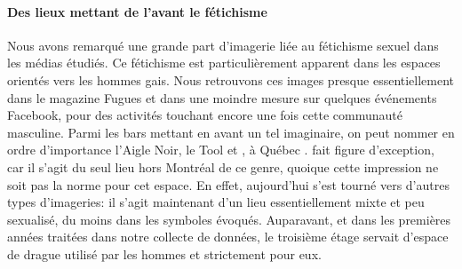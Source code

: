 \paragraph{Des lieux mettant de l'avant le fétichisme}
Nous avons remarqué une grande part d'imagerie liée au fétichisme sexuel dans les médias étudiés.
Ce fétichisme est particulièrement apparent dans les espaces orientés vers les hommes gais.
Nous retrouvons ces images presque essentiellement dans le magazine Fugues et dans une moindre mesure sur quelques événements Facebook, pour des activités touchant encore une fois cette communauté masculine.
Parmi les bars mettant en avant un tel imaginaire, on peut nommer en ordre d'importance l'Aigle Noir, le Tool et , à Québec .
 fait figure d'exception, car il s'agit du seul lieu hors Montréal de ce genre, quoique cette impression ne soit pas la norme pour cet espace.
En effet, aujourd'hui  s'est tourné vers d'autres types d'imageries: il s'agit maintenant d'un lieu essentiellement mixte et peu sexualisé, du moins dans les symboles évoqués.
Auparavant, et dans les premières années traitées dans notre collecte de données, le troisième étage servait d'espace de drague utilisé par les hommes et strictement pour eux.

